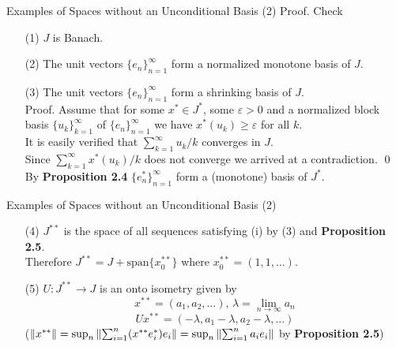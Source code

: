 \documentclass{beamer}
\begin{document}
\begin{frame}{Examples of Spaces without an Unconditional Basis (2)}
    Proof. Check \begin{itemize}
        \item[(1)] $J$ is Banach. 
    	\item[(2)] The unit vectors $\{e_n\}_{n=1}^\infty$ form a normalized monotone basis of $J$.
    	\item[(3)] The unit vectors $\{e_n\}_{n=1}^\infty$ form a shrinking basis of $J$.\\ 
    		Proof. Assume that for some $x^*\in J^*$, some $\varepsilon>0$ and a normalized block basis $\{u_k\}_{k=1}^\infty$ of $\{e_n\}_{n=1}^\infty$
    		we have $x^*(u_k)\geq\varepsilon$ for all $k$.\\
    		It is easily verified that $\sum_{k=1}^\infty u_k/k$ converges in $J$.\\
    		Since $\sum_{k=1}^\infty x^*(u_k)/k$ does not converge we arrived at a contradiction. \qed \\
    	\noindent By \textbf{Proposition 2.4} $\{e_n^*\}_{n=1}^\infty$ form a (monotone) basis of $J^*$.
    \end{itemize}
\end{frame}
\begin{frame}{Examples of Spaces without an Unconditional Basis (2)}
    \begin{itemize}
        \item[(4)] $J^{**}$ is the space of all sequences satisfying (i) by (3) and \textbf{Proposition 2.5}.\\
    	Therefore $J^{**}=J+\text{span}\{x_0^{**}\}$ where $x_0^{**}=(1,1,\ldots)$.
    	\item[(5)] $U:J^{**}\to J$ is an onto isometry given by
        $$x^{**}=(a_1,a_2,\ldots),\,\lambda=\lim_{n\to\infty}a_n$$
    	$$Ux^{**}=(-\lambda,a_1-\lambda,a_2-\lambda,\ldots)$$
    	($\left\lVert x^{**} \right\rVert=\sup_n\left\lVert \sum_{i=1}^n(x^{**}e_i^*)e_i \right\rVert=\sup_n\left\lVert \sum_{i=1}^na_ie_i \right\rVert$ by \textbf{Proposition 2.5})
    \end{itemize}
\end{frame}
\end{document}
